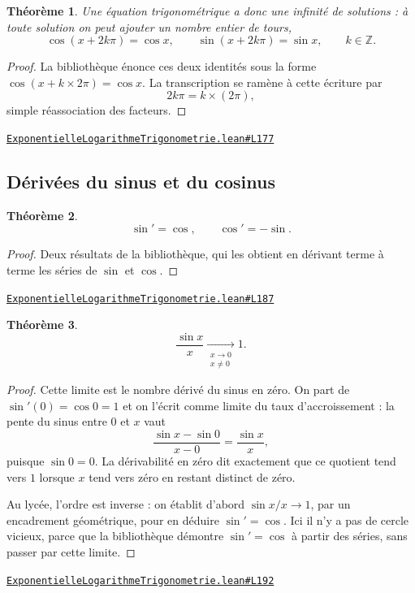 \documentclass[11pt,a4paper]{article}
\theoremstyle{definition}
\theoremstyle{plain}
\newtheorem{theoreme}{Théorème}
\newcommand{\source}[2]{\par\smallskip\noindent\hfill{\footnotesize\href{#1}{\texttt{#2}}}\par\smallskip}
\begin{document}
\begin{theoreme}
Une équation trigonométrique a donc une infinité de solutions : à toute solution on peut
ajouter un nombre entier de tours,
\[ \cos(x + 2k\pi) = \cos x, \qquad \sin(x + 2k\pi) = \sin x, \qquad k \in \mathbb{Z} . \]
\end{theoreme}

\begin{proof}
La bibliothèque énonce ces deux identités sous la forme $\cos(x + k \times 2\pi) = \cos x$.
La transcription se ramène à cette écriture par
\[ 2k\pi = k \times (2\pi) , \]
simple réassociation des facteurs.
\end{proof}
\source{https://github.com/Commutator-IO/learn-lean/blob/main/cours/02-lycee/05-exponentielle-logarithme-trigonometrie/ExponentielleLogarithmeTrigonometrie.lean\#L177}{ExponentielleLogarithmeTrigonometrie.lean\#L177}

\subsection{Dérivées du sinus et du cosinus}

\begin{theoreme}
\[ \sin' = \cos, \qquad \cos' = -\sin . \]
\end{theoreme}

\begin{proof}
Deux résultats de la bibliothèque, qui les obtient en dérivant terme à terme les séries de
$\sin$ et $\cos$.
\end{proof}
\source{https://github.com/Commutator-IO/learn-lean/blob/main/cours/02-lycee/05-exponentielle-logarithme-trigonometrie/ExponentielleLogarithmeTrigonometrie.lean\#L187}{ExponentielleLogarithmeTrigonometrie.lean\#L187}

\begin{theoreme}
\[ \frac{\sin x}{x} \xrightarrow[\substack{x \to 0 \\ x \ne 0}]{} 1 . \]
\end{theoreme}

\begin{proof}
Cette limite est le nombre dérivé du sinus en zéro. On part de $\sin'(0) = \cos 0 = 1$ et
on l'écrit comme limite du taux d'accroissement : la pente du sinus entre $0$ et $x$ vaut
\[ \frac{\sin x - \sin 0}{x - 0} = \frac{\sin x}{x} , \]
puisque $\sin 0 = 0$. La dérivabilité en zéro dit exactement que ce quotient tend vers $1$
lorsque $x$ tend vers zéro en restant distinct de zéro.

\medskip\noindent
Au lycée, l'ordre est inverse : on établit d'abord $\sin x / x \to 1$, par un encadrement
géométrique, pour en déduire $\sin' = \cos$. Ici il n'y a pas de cercle vicieux, parce que
la bibliothèque démontre $\sin' = \cos$ à partir des séries, sans passer par cette limite.
\end{proof}
\source{https://github.com/Commutator-IO/learn-lean/blob/main/cours/02-lycee/05-exponentielle-logarithme-trigonometrie/ExponentielleLogarithmeTrigonometrie.lean\#L192}{ExponentielleLogarithmeTrigonometrie.lean\#L192}
\end{document}
